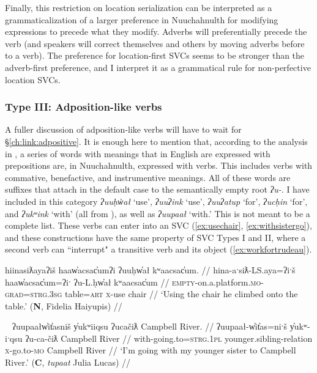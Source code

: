 Finally, this restriction on location serialization can be interpreted as a grammaticalization of a larger preference in Nuuchahnulth for modifying expressions to precede what they modify. Adverbs will preferentially precede the verb (and speakers will correct themselves and others by moving adverbs before to a verb). The preference for location-first SVCs seems to be stronger than the adverb-first preference, and I interpret it as a grammatical rule for non-perfective location SVCs.

\vspace{10pt}

\subsubsection{Type III: Adposition-like verbs} \label{ch:sv:data:type3}

\vspace{10pt}

A fuller discussion of adposition-like verbs will have to wait for \S\ref{ch:link:adpositive}. It is enough here to mention that, according to the analysis in \cite{woo2007b}, a series of words with meanings that in English are expressed with prepositions are, in Nuuchahnulth, expressed with verbs. This includes verbs with commative, benefactive, and instrumentive meanings. All of these words are suffixes that attach in the default case to the semantically empty root \textit{ʔu-}. I have included in this category \textit{ʔuuḥw̓ał} `use', \textit{ʔuuʔink} `use', \textit{ʔuuʔatup} `for', \textit{ʔucḥin} `for', and \textit{ʔukʷink} `with' (all from \citealt[p.15]{woo2007b}), as well as \textit{ʔuupaał} `with.' This is not meant to be a complete list. These verbs can enter into an SVC  (\ref{ex:usechair}, \ref{ex:withsistergo}), and these constructions have the same property of SVC Types I and II, where a second verb can ``interrupt" a transitive verb and its object (\ref{ex:workfortrudeau}).


\ex \label{ex:usechair}
\begingl
\glpreamble hiinasiƛayaʔiš haaw̓acsac̓umʔi ʔuuḥw̓ał kʷaacsac̓um. //
\gla hina-aˑsiƛ-LS.aya=ʔiˑš haaw̓acsac̓um=ʔiˑ ʔu-L.ḥw̓ał kʷaacsac̓um //
\glb \textsc{empty}-on.a.platform.\textsc{mo}-\textsc{grad}=\textsc{strg.3sg} table=\textsc{art} \textsc{x}-use chair //
\glft `Using the chair he climbed onto the table.' (\textbf{N}, Fidelia Haiyupis) //
\endgl
\xe

\ex~ \label{ex:withsistergo}
\begingl
\glpreamble ʔuupaałw̓it̓asniš y̓ukʷiiqsu ʔucačiƛ Campbell River. //
\gla ʔuupaał-w̓it̓as=niˑš y̓ukʷ-iˑqsu ʔu-ca-čiƛ Campbell River //
\glb with-going.to=\textsc{strg.1pl} younger.sibling-relation \textsc{x}-go.to-\textsc{mo} Campbell River //
\glft `I'm going with my younger sister to Campbell River.' (\textbf{C}, \textit{tupaat} Julia Lucas) //
\endgl
\xe

